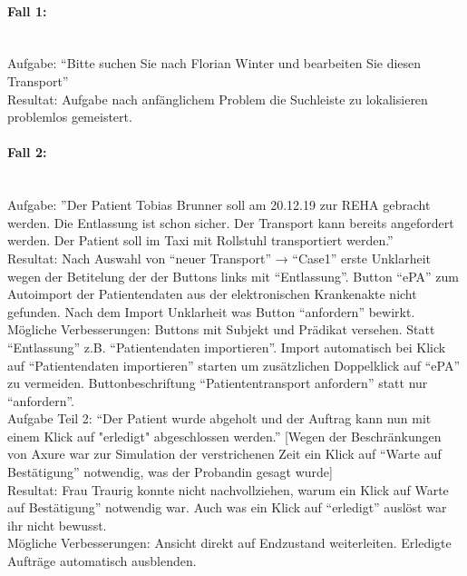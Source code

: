 \documentclass[a4paper, ngerman, 12pt]{scrartcl}
\begin{document}
\paragraph{Fall 1:}\leavevmode\\
Aufgabe: “Bitte suchen Sie nach Florian Winter und bearbeiten Sie diesen Transport”\\
 
Resultat: Aufgabe nach anfänglichem Problem die Suchleiste zu lokalisieren problemlos gemeistert.

\paragraph{Fall 2:}\leavevmode\\
Aufgabe: ”Der Patient Tobias Brunner soll am 20.12.19 zur REHA gebracht werden. Die Entlassung ist schon sicher. Der Transport kann bereits angefordert werden. Der Patient soll im Taxi mit Rollstuhl transportiert werden.”\\
 
Resultat: Nach Auswahl von “neuer Transport” → “Case1” erste Unklarheit wegen der Betitelung der der Buttons links mit “Entlassung”. Button “ePA” zum Autoimport der Patientendaten aus der elektronischen Krankenakte nicht gefunden. Nach dem Import Unklarheit was Button “anfordern” bewirkt.\\

Mögliche Verbesserungen: Buttons mit Subjekt und Prädikat versehen. Statt “Entlassung” z.B. “Patientendaten importieren”. Import automatisch bei Klick auf “Patientendaten importieren” starten um zusätzlichen Doppelklick auf “ePA” zu vermeiden. Buttonbeschriftung “Patiententransport  anfordern” statt nur “anfordern”.\\
 
Aufgabe Teil 2: “Der Patient wurde abgeholt und der Auftrag kann nun mit einem Klick auf "erledigt" abgeschlossen werden.”
[Wegen der Beschränkungen von Axure war zur Simulation der verstrichenen Zeit ein Klick auf “Warte auf Bestätigung” notwendig, was der Probandin gesagt wurde]\\
 
Resultat: Frau Traurig konnte nicht nachvollziehen, warum ein Klick auf Warte auf Bestätigung” notwendig war. Auch was ein Klick auf “erledigt” auslöst war ihr nicht bewusst.\\
 
Mögliche Verbesserungen: Ansicht direkt auf Endzustand weiterleiten. Erledigte Aufträge automatisch ausblenden.
\end{document}
